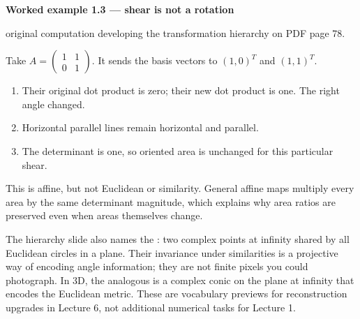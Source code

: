 \documentclass[letterpaper,11pt,english,openany,oneside]{jupyterBook}
\begin{document}
\label{\detokenize{lectures/lecture01/transformations:ex-lec01-family}}
\begin{TextbookBox}
\textbf{Worked example 1.3 — shear is not a rotation}\par\smallskip

\sphinxAtStartPar
{} original computation developing the transformation hierarchy on PDF page 78.

\sphinxAtStartPar
Take \(A=\begin{pmatrix}1&1\\0&1\end{pmatrix}\). It sends the basis vectors to \((1,0)^T\) and \((1,1)^T\).
\begin{enumerate}
%
\item {}
\sphinxAtStartPar
Their original dot product is zero; their new dot product is one. The right angle changed.

\item {}
\sphinxAtStartPar
Horizontal parallel lines remain horizontal and parallel.

\item {}
\sphinxAtStartPar
The determinant is one, so oriented area is unchanged for this particular shear.

\end{enumerate}

\sphinxAtStartPar
This is affine, but not Euclidean or similarity. General affine maps multiply every area by the same determinant magnitude, which explains why area ratios are preserved even when areas themselves change.

\end{TextbookBox}

\sphinxAtStartPar
The hierarchy slide also names the : two complex points at infinity shared by all Euclidean circles in a plane. Their invariance under similarities is a projective way of encoding angle information; they are not finite pixels you could photograph. In 3D, the analogous  is a complex conic on the plane at infinity that encodes the Euclidean metric. These are vocabulary previews for reconstruction upgrades in Lecture 6, not additional numerical tasks for Lecture 1.
\end{document}
